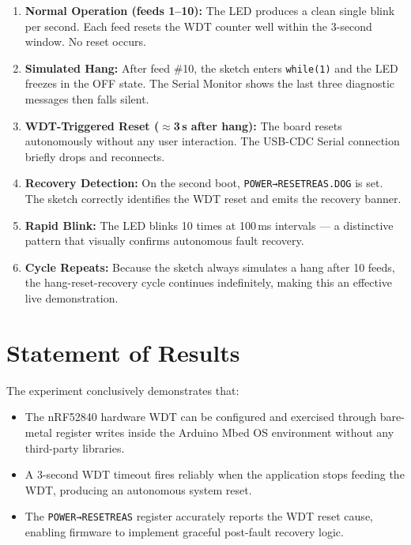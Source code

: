 \documentclass[12pt, a4paper]{article}
\begin{document}
\begin{enumerate}[label=\arabic*.]
  \item \textbf{Normal Operation (feeds 1–10):}  
        The LED produces a clean single blink per second. Each feed resets the
        WDT counter well within the 3-second window. No reset occurs.

  \item \textbf{Simulated Hang:}  
        After feed \#10, the sketch enters \texttt{while(1)} and the LED
        freezes in the OFF state. The Serial Monitor shows the last three
        diagnostic messages then falls silent.

  \item \textbf{WDT-Triggered Reset ($\approx$3\,s after hang):}  
        The board resets autonomously without any user interaction. The USB-CDC
        Serial connection briefly drops and reconnects.

  \item \textbf{Recovery Detection:}  
        On the second boot, \texttt{POWER→RESETREAS.DOG} is set. The sketch
        correctly identifies the WDT reset and emits the recovery banner.

  \item \textbf{Rapid Blink:}  
        The LED blinks 10 times at 100\,ms intervals — a distinctive pattern
        that visually confirms autonomous fault recovery.

  \item \textbf{Cycle Repeats:}  
        Because the sketch always simulates a hang after 10 feeds, the
        hang-reset-recovery cycle continues indefinitely, making this an
        effective live demonstration.
\end{enumerate}

\section{Statement of Results}

The experiment conclusively demonstrates that:

\begin{itemize}
  \item The nRF52840 hardware WDT can be configured and exercised through
        bare-metal register writes inside the Arduino Mbed OS environment
        without any third-party libraries.
  \item A 3-second WDT timeout fires reliably when the application stops
        feeding the WDT, producing an autonomous system reset.
  \item The \texttt{POWER→RESETREAS} register accurately reports the WDT
        reset cause, enabling firmware to implement graceful post-fault
        recovery logic.
\end{itemize}
\end{document}
